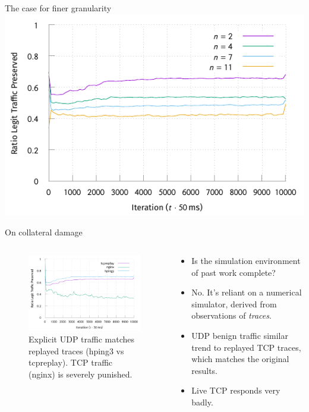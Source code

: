\documentclass[aspectratio=169,xcolor={dvipsnames}
,hide notes
]{beamer}
\begin{document}
\begin{frame}{The case for finer granularity}
\centering
\includegraphics[width=0.8\linewidth]{../plots/online-varyN-binary-pres.pdf}
\end{frame}

\begin{frame}{On collateral damage}
\begin{columns}
	\begin{column}{0.5\linewidth}
		\begin{figure}
			\includegraphics[width=\linewidth]{../plots/online-varyN-nginx-pres.pdf}
			\caption{Explicit UDP traffic matches replayed traces (hping3 vs tcpreplay). TCP traffic (nginx) is severely punished.}
		\end{figure}
	\end{column}
	\begin{column}{0.45\linewidth}
		\begin{itemize}
			\item Is the simulation environment of past work complete?
			\item \alert{No.} It's reliant on a numerical simulator, derived from observations of \emph{traces}.
			\item UDP benign traffic similar trend to replayed TCP traces, which matches the original results.
			\item Live TCP responds very badly.
		\end{itemize}
	\end{column}
\end{columns}
\end{frame}
\end{document}
